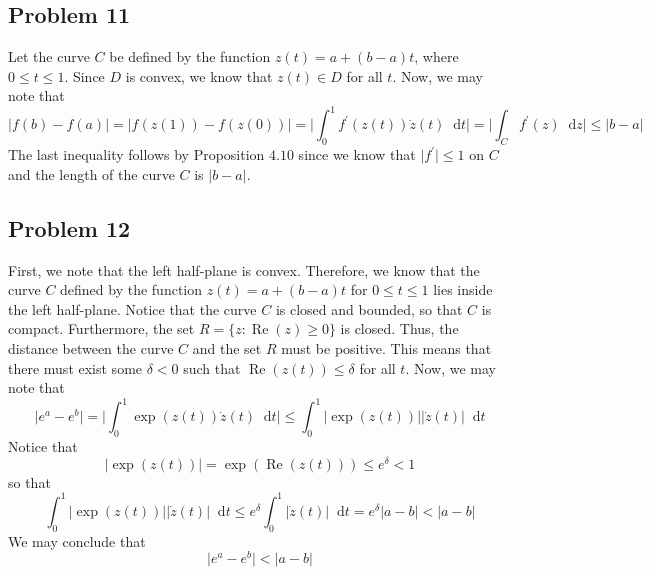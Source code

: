 \documentclass[12pt]{article}
\newcommand*\diff{\mathop{}\!\mathrm{d}}
\DeclareMathOperator{\re}{Re}
\begin{document}
\subsection*{Problem 11}
Let the curve $C$ be defined by the function $z(t) = a + (b-a)t$, where $0 \leq t \leq 1$. Since $D$ is convex, we know that $z(t) \in D$ for all $t$. Now, we may note that
\[
\vert f(b) - f(a) \vert  = \vert f(z(1)) - f(z(0)) \vert = \bigg \vert \int_0^1 f^\prime(z(t)) \dot{z}(t) \diff t\bigg \vert = \bigg \vert \int_C f^\prime(z) \diff z \bigg \vert \leq \vert b-a \vert
\] The last inequality follows by Proposition $4.10$ since we know that $\vert f^\prime \vert \leq 1$ on $C$ and the length of the curve $C$ is $\vert b - a \vert$.
\newpage
\subsection*{Problem 12}
First, we note that the left half-plane is convex. Therefore, we know that the curve $C$ defined by the function $z(t) = a + (b-a)t$ for $0\leq t \leq 1$ lies inside the left half-plane. Notice that the curve $C$ is closed and bounded, so that $C$ is compact. Furthermore, the set $R =\{z: \re(z) \geq 0\}$ is closed. Thus, the distance between the curve $C$ and the set $R$ must be positive. This means that there must exist some $\delta < 0$ such that $\re(z(t)) \leq \delta$ for all $t$. Now, we may note that
\[
\vert e^a - e^b \vert = \bigg \vert \int_0^1 \exp(z(t)) \dot{z}(t) \diff t \bigg \vert \leq \int_0^1 \vert \exp(z(t)) \vert \vert \dot{z}(t) \vert \diff t 
\] Notice that
\[
\vert \exp(z(t)) \vert = \exp(\re(z(t))) \leq e^\delta < 1
\] so that
\[
\int_0^1 \vert \exp(z(t)) \vert \vert \dot{z}(t) \vert \diff t \leq e^\delta \int_0^1 \vert \dot{z}(t) \vert \diff t = e^\delta \vert a - b\vert < \vert a - b \vert
\] We may conclude that
\[
\vert e^a - e^b \vert < \vert a - b \vert
\]
\end{document}
